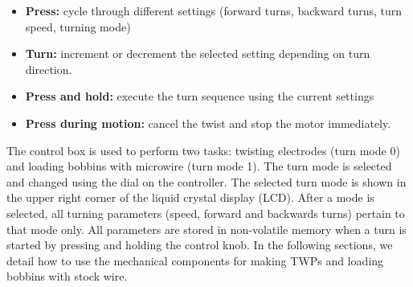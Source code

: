 \documentclass[11pt,a4paper]{article}
\begin{document}
\begin{itemize}[noitemsep]
    \item \textbf{Press:} cycle through different settings (forward turns,
        backward turns, turn speed, turning mode)
    \item \textbf{Turn:} increment or decrement the selected setting
        depending on turn direction.
    \item \textbf{Press and hold:} execute the turn sequence using the
        current settings
    \item \textbf{Press during motion:} cancel the twist and stop the motor
        immediately.
\end{itemize}

The control box is used to perform two tasks: twisting electrodes (turn mode 0)
and loading bobbins with microwire (turn mode 1). The turn mode is selected and
changed using the dial on the controller. The selected turn mode is shown in
the upper right corner of the liquid crystal display (LCD). After a mode is
selected, all turning parameters (speed, forward and backwards turns) pertain
to that mode only. All parameters are stored in non-volatile memory when a turn
is started by pressing and holding the control knob. In the following sections,
we detail how to use the mechanical components for making TWPs and loading
bobbins with stock wire.
\end{document}
